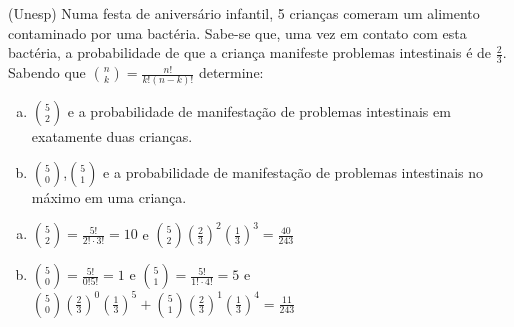 \begin{ex}
   (Unesp) Numa festa de aniversário infantil, 5 crianças comeram um alimento contaminado por uma bactéria. Sabe-se que, uma vez em contato com esta bactéria, a probabilidade de que a criança manifeste problemas intestinais é de $\frac{2}{3}$. Sabendo que
\(\binom{n}{k} = \frac{n!}{k!(n-k)!}\) determine: 
   \begin{enumerate}[(a)]
   \item \(\binom{5}{2}\) e a probabilidade de manifestação de problemas intestinais em exatamente duas crianças.
   \item \(\binom{5}{0}\),\(\binom{5}{1}\) e a probabilidade de manifestação de problemas intestinais no máximo
   em uma criança.
   \end{enumerate}
     \begin{sol}
       \phantom{A}
         \begin{enumerate} [(a)]
             \item $\binom{5}{2}=\frac{5!}{2!\cdot3!}=10$ \hspace{0,5cm} e \hspace{0,5cm}$\binom{5}{2}(\frac{2}{3})^2 (\frac{1}{3})^3=\frac{40}{243}$
            \item $\binom{5}{0}=\frac{5!}{0!5!}=1$ \hspace{0,5cm} e \hspace{0,5cm} $\binom{5}{1}=\frac{5!}{1!\cdot4!}= 5$ \hspace{0,5cm}
             e \hspace{0,5cm} $\binom{5}{0}(\frac{2}{3})^0(\frac{1}{3})^5+\binom{5}{1}(\frac{2}{3})^1(\frac{1}{3})^4=\frac{11}{243}$
             
         \end{enumerate}
     \end{sol}

\end{ex}